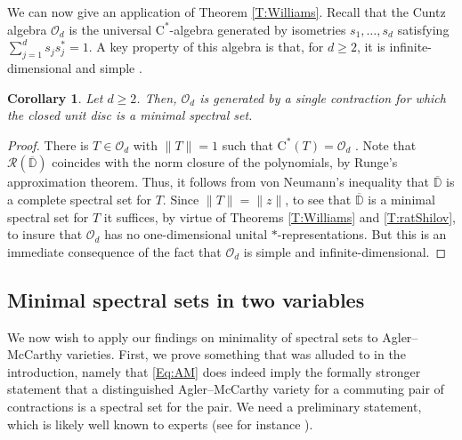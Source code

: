 \documentclass[10pt]{amsart}
\newcommand{\bD}{{\mathbb{D}}}
\renewcommand{\O}{{\mathcal{O}}}
\newcommand{\R}{{\mathcal{R}}}
\newcommand{\rC}{\mathrm{C}}
\newcommand{\ol}{\overline}
\newtheorem{corollary}[lemma]{Corollary}
\theoremstyle{definition}
\begin{document}
We can now give an application of Theorem \ref{T:Williams}. Recall that the Cuntz algebra $\O_d$ is the universal $\rC^*$-algebra generated by isometries $s_1,\ldots,s_d$ satisfying $\sum_{j=1}^d s_j s_j^*=1$. A key property of this algebra is that, for $d\geq 2$, it is infinite-dimensional and simple \cite[Theorem 1.13]{cuntz1977}.

\begin{corollary}\label{C:Cuntz}
Let $d\geq 2$. Then, $\O_d$ is generated by a single contraction for which the closed unit disc is a minimal spectral set.
\end{corollary}
\begin{proof}
There is $T\in \O_d$ with $\|T\|=1$ such that $\rC^*(T)=\O_d$ \cite{nagisa2004}. Note  that $\R(\ol{\bD})$ coincides with the norm closure of the polynomials, by Runge's approximation theorem. Thus, it follows from von Neumann's inequality that $\ol{\bD}$ is a complete spectral set for $T$. Since $\|T\|=\|z\|$, to see that $\ol{\bD}$ is a minimal spectral set for $T$ it suffices, by virtue of Theorems \ref{T:Williams} and \ref{T:ratShilov}, to insure that $\O_d$ has no one-dimensional unital $*$-representations. But this is an immediate consequence of the fact that $\O_d$ is simple and infinite-dimensional.
\end{proof}



\subsection{Minimal spectral sets in two variables}

We now wish to apply our findings on minimality of spectral sets to Agler--McCarthy varieties. First, we prove something that was alluded to in the introduction, namely that \eqref{Eq:AM} does indeed imply the formally stronger statement that a distinguished Agler--McCarthy variety for a commuting pair of contractions is a spectral set for the pair. We need a preliminary statement, which is likely well known to experts (see for instance \cite[Lemma 7.4]{BKS2022}).
\end{document}
